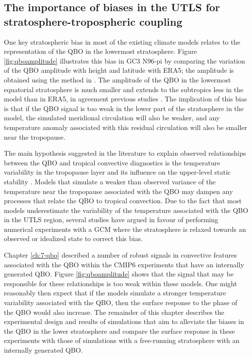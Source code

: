 \subsection{The importance of biases in the UTLS for stratosphere-tropospheric coupling}

One key stratospheric bias in most of the existing climate models relates to the representation of the QBO in the lowermost stratosphere. Figure \ref{fig:qboamplitude} illustrates this bias in GC3 N96-pi by comparing the variation of the QBO amplitude  with height and latitude with ERA5; the amplitude is obtained using the method in \cite{schenzinger2017}. The amplitude of the QBO in the lowermost equatorial stratosphere is much smaller and extends to the subtropics less in the model than in ERA5, in agreement previous studies \citep{schenzinger2017,richter2020,bushell2020}. The implication of this bias is that if the QBO signal is too weak in the lower part of the stratosphere in the model, the simulated meridional circulation will also be weaker, and any temperature anomaly associated with this residual circulation will also be smaller near the tropopause. 

The main hypothesis suggested in the literature to explain observed relationships between the QBO and tropical convective diagnostics is the temperature variability in the tropopause layer and its influence on the upper-level static stability \citep[][]{collimore2003,liess2012,nie2015,gray2018}.
Models that simulate a weaker than observed variance of the temperature near the tropopause associated with the QBO may dampen any processes that relate the QBO to tropical convection.
Due to the fact that most models underestimate the variability of the temperature associated with the QBO in the UTLS region, several studies have argued in favour of performing numerical experiments with a GCM where the stratosphere is relaxed towards an observed or idealized state \citep[e.g.][]{lee2018,martin2021} to correct this bias. 

Chapter \ref{ch:7-qbo} described a number of robust signals in convective features associated with the QBO within the CMIP6 experiments that have an internally generated QBO. 
Figure \ref{fig:qboamplitude} shows that the signal that may be responsible for these relationships is too weak within these models. 
One might reasonably then expect that if the models simulate a stronger temperature variability associated with the QBO, then the surface response to the phase of the QBO would also increase. 
The remainder of this chapter describes the experimental design and results of simulations that aim to alleviate the biases in the QBO in the lower stratosphere and compare the surface response in these experiments with those of simulations with a free-running stratosphere with an internally generated QBO.

